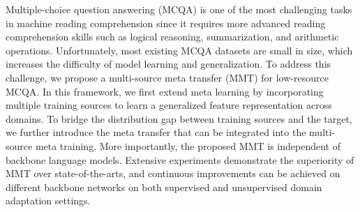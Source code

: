 Multiple-choice question answering (MCQA) is one of the most challenging tasks in machine reading comprehension since it requires more advanced reading comprehension skills such as logical reasoning, summarization, and arithmetic operations. Unfortunately, most existing MCQA datasets are small in size, which increases the difficulty of model learning and generalization. To address this challenge, we propose a multi-source meta transfer (MMT) for low-resource MCQA. In this framework,  we first extend meta learning by incorporating multiple training sources to learn a generalized feature representation across domains. To bridge the distribution gap between training sources and the target, we further introduce the meta transfer that can be integrated into the multi-source meta training. More importantly, the proposed MMT is independent of backbone language models. Extensive experiments demonstrate the superiority of MMT over state-of-the-arts, and continuous improvements can be achieved on different backbone networks on both supervised and unsupervised domain adaptation settings.
